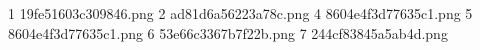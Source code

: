 1 19fe51603c309846.png
2 ad81d6a56223a78c.png
4 8604e4f3d77635c1.png
5 8604e4f3d77635c1.png
6 53e66c3367b7f22b.png
7 244cf83845a5ab4d.png
